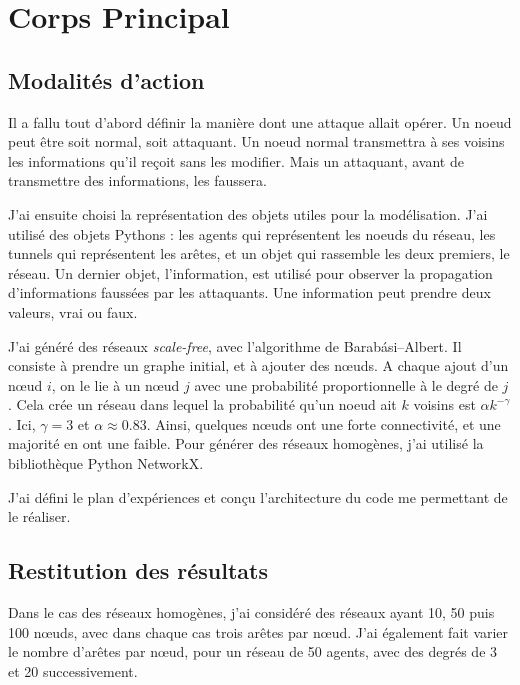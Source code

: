 \documentclass[12pt,a4paper]{article}
\begin{document}
\section{Corps Principal} %

\subsection{Modalités d'action} %

Il a fallu tout d'abord définir la manière dont une attaque allait opérer.
Un noeud peut être soit normal, soit attaquant.
Un noeud normal transmettra à ses voisins les informations qu'il reçoit sans les modifier.
Mais un attaquant, avant de transmettre des informations, les faussera.


J'ai ensuite choisi la représentation des objets utiles pour la modélisation.
J'ai utilisé des objets Pythons : les agents qui représentent les noeuds du réseau, les tunnels qui représentent les arêtes, et un objet qui rassemble les deux premiers, le réseau.
Un dernier objet, l'information, est utilisé pour observer la propagation d'informations faussées par les attaquants.
Une information peut prendre deux valeurs, vrai ou faux.


J'ai généré des réseaux \emph{scale-free}, avec l'algorithme de Barabási–Albert.
Il consiste à prendre un graphe initial, et à ajouter des nœuds.
A chaque ajout d'un nœud $i$, on le lie à un nœud $j$ avec une probabilité proportionnelle à le degré de $j$.
Cela crée un réseau dans lequel la probabilité qu'un noeud ait $k$ voisins est $\alpha k^{-\gamma}$.
Ici, $\gamma = 3$ et $\alpha \approx 0.83$.
Ainsi, quelques nœuds ont une forte connectivité, et une majorité en ont une faible.
Pour générer des réseaux homogènes, j'ai utilisé la bibliothèque Python NetworkX.

J'ai défini le plan d'expériences et conçu l'architecture du code me permettant de le réaliser.


\subsection{Restitution des résultats} %

Dans le cas des réseaux homogènes, j'ai considéré des réseaux ayant 10, 50 puis 100 nœuds, avec dans chaque cas trois arêtes par nœud.
J'ai également fait varier le nombre d'arêtes par nœud, pour un réseau de 50 agents, avec des degrés de 3 et 20 successivement.
\end{document}
